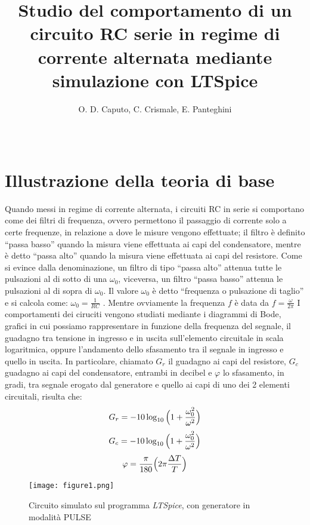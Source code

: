 \documentclass{article}
\title{Studio del comportamento di un circuito RC serie
in regime di corrente alternata mediante
simulazione con LTSpice}
\author{O. D. Caputo, C. Crismale, E. Panteghini}
\date{~}
\begin{document}
\maketitle

\section{Illustrazione della teoria di base}
Quando messi in regime di corrente alternata, i circuiti RC in serie si comportano come dei filtri di frequenza, ovvero permettono il passaggio di corrente solo a certe frequenze, in relazione
a dove le misure vengono effettuate; il filtro è definito “passa basso”
quando la misura viene effettuata ai capi del condensatore, mentre è detto “passa
alto” quando la misura viene effettuata ai capi del resistore. Come si evince dalla
denominazione, un filtro di tipo “passa alto” attenua tutte le pulsazioni al di
sotto di una $\omega_0$, viceversa, un filtro “passa basso” attenua le pulsazioni al di
sopra di $\omega_0$. Il valore $\omega_0$ è detto “frequenza o pulsazione di taglio” e si
calcola come: $\omega_0 = \frac{1}{RC}$ . Mentre ovviamente la frequenza $f$ è data da $f = \frac{\omega}
{2\pi}$
I comportamenti dei ciruciti vengono studiati mediante i diagrammi
di Bode, grafici in cui possiamo rappresentare in funzione della frequenza del segnale, il guadagno tra tensione in ingresso e in uscita sull’elemento circuitale in scala logaritmica, oppure
l’andamento dello sfasamento tra il segnale in ingresso e quello in uscita. In particolare, chiamato $G_r$ il guadagno ai
capi del resistore, $G_c$ guadagno ai capi del condensatore, entrambi in decibel e
$\varphi$ lo sfasamento, in gradi, tra segnale erogato dal generatore e quello ai capi di uno dei 2 elementi circuitali,  risulta che:
\begin{equation}
    G_r = -10\log_{10}{\Bigl( 1 + \frac{\omega_0^2}{\omega^2}\Bigl)}
\end{equation}
\begin{equation}
     G_c = -10\log_{10}{\Bigl( 1 + \frac{\omega_0^2}{\omega^2}\Bigl)}
\end{equation}
\begin{equation}
    \varphi = \frac{\pi}{180} \Bigl( 2\pi \frac{\Delta T}{T} \Bigl)
\end{equation}

\begin{figure}
    \centering
    \texttt{[image: figure1.png]}
    \caption{Circuito simulato sul programma \emph{LTSpice}, con generatore in modalità PULSE}
    \label{figura1}
\end{figure}
\end{document}
